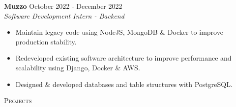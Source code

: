 \documentclass[a4paper]{article}
\newcommand{\lineunder} {
    \vspace*{-8pt} \\
    \hspace*{-18pt} \hrulefill \\
}
\newcommand{\header} [1] {
    {\hspace*{-18pt}\vspace*{6pt} \textsc{#1}}
    \vspace*{-6pt} \lineunder
}
\begin{document}
{\textbf{Muzzo }}\hfill October 2022 - December 2022 \\
 {\textit{Software Development Intern - Backend}}  \
\vspace{-2.5mm}
\begin{itemize} 
\item Maintain legacy code using NodeJS, MongoDB \& Docker to improve production stability. 
\vspace{-2mm}
\item Redeveloped existing software architecture to improve performance and scalability using Django, Docker \& AWS.
\vspace{-2mm}
\item Designed \& developed databases and table structures with PostgreSQL.
\end{itemize}

\header{Projects}
\end{document}
